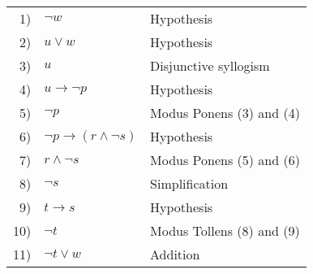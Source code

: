 \begin{Solution}{4.3}

	 \begin{tabular}[t]{r l l}
	 1)& $\lnot w $               & Hypothesis\\
	 2)& $u \lor w$                 & Hypothesis\\
	 3)& $u$                   & Disjunctive syllogism \\
	 4)& $u \to \lnot p$                   & Hypothesis\\
	 5)& $\lnot p$              & Modus Ponens (3) and (4)\\
	 6)& $\lnot p \to (r \land \lnot s)$                      & Hypothesis\\
	 7)& $r \land \lnot s$             & Modus Ponens (5) and (6) \\
	 8)& $\lnot s$                       & Simplification \\
	 9)& $t \to s$                      & Hypothesis\\
	 10)& $\lnot t$             & Modus Tollens (8) and (9) \\
	 11)& $\lnot t \lor w$                       & Addition \\	 
	 \end{tabular}
\end{Solution}
